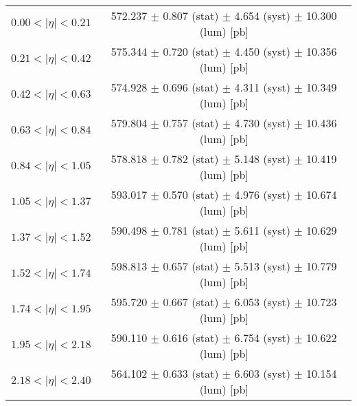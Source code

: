 \begin{tabular}{lc}
\hline
$0.00 < |\eta| <0.21$          & 572.237 $\pm$ 0.807 (stat) $\pm$ 4.654 (syst) $\pm$ 10.300 (lum) [pb]  \\
$0.21 < |\eta| <0.42$          & 575.344 $\pm$ 0.720 (stat) $\pm$ 4.450 (syst) $\pm$ 10.356 (lum) [pb]  \\
$0.42 < |\eta| <0.63$          & 574.928 $\pm$ 0.696 (stat) $\pm$ 4.311 (syst) $\pm$ 10.349 (lum) [pb]  \\
$0.63 < |\eta| <0.84$          & 579.804 $\pm$ 0.757 (stat) $\pm$ 4.730 (syst) $\pm$ 10.436 (lum) [pb]  \\
$0.84 < |\eta| <1.05$          & 578.818 $\pm$ 0.782 (stat) $\pm$ 5.148 (syst) $\pm$ 10.419 (lum) [pb]  \\
$1.05 < |\eta| <1.37$          & 593.017 $\pm$ 0.570 (stat) $\pm$ 4.976 (syst) $\pm$ 10.674 (lum) [pb]  \\
$1.37 < |\eta| <1.52$          & 590.498 $\pm$ 0.781 (stat) $\pm$ 5.611 (syst) $\pm$ 10.629 (lum) [pb]  \\
$1.52 < |\eta| <1.74$          & 598.813 $\pm$ 0.657 (stat) $\pm$ 5.513 (syst) $\pm$ 10.779 (lum) [pb]  \\
$1.74 < |\eta| <1.95$          & 595.720 $\pm$ 0.667 (stat) $\pm$ 6.053 (syst) $\pm$ 10.723 (lum) [pb]  \\
$1.95 < |\eta| <2.18$          & 590.110 $\pm$ 0.616 (stat) $\pm$ 6.754 (syst) $\pm$ 10.622 (lum) [pb]  \\
$2.18 < |\eta| <2.40$          & 564.102 $\pm$ 0.633 (stat) $\pm$ 6.603 (syst) $\pm$ 10.154 (lum) [pb]  \\
\hline
\end{tabular}
